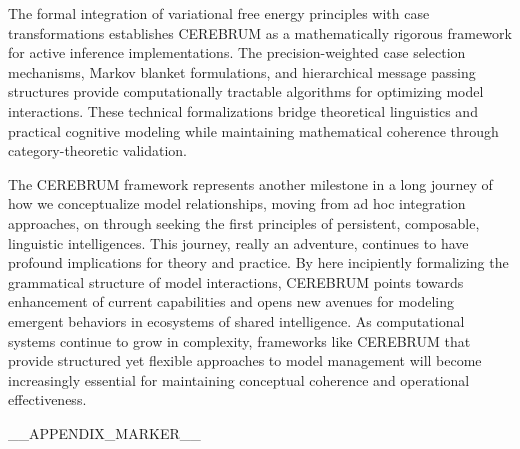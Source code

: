 The formal integration of variational free energy principles with case
transformations establishes CEREBRUM as a mathematically rigorous
framework for active inference implementations. The precision-weighted
case selection mechanisms, Markov blanket formulations, and hierarchical
message passing structures provide computationally tractable algorithms
for optimizing model interactions. These technical formalizations bridge
theoretical linguistics and practical cognitive modeling while
maintaining mathematical coherence through category-theoretic
validation.

The CEREBRUM framework represents another milestone in a long journey of
how we conceptualize model relationships, moving from ad hoc integration
approaches, on through seeking the first principles of persistent,
composable, linguistic intelligences. This journey, really an adventure,
continues to have profound implications for theory and practice. By here
incipiently formalizing the grammatical structure of model interactions,
CEREBRUM points towards enhancement of current capabilities and opens
new avenues for modeling emergent behaviors in ecosystems of shared
intelligence. As computational systems continue to grow in complexity,
frameworks like CEREBRUM that provide structured yet flexible approaches
to model management will become increasingly essential for maintaining
conceptual coherence and operational effectiveness.

__APPENDIX_MARKER__



